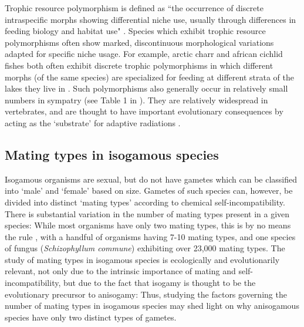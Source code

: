 Trophic resource polymorphism is defined as ``the occurrence of discrete intraspecific morphs showing differential niche use, usually through differences in feeding biology and habitat use" \citep{skulason_resource_1995}. Species which exhibit trophic resource polymorphisms often show marked, discontinuous morphological variations adapted for specific niche usage. For example, arctic charr and african cichlid fishes both often exhibit discrete trophic polymorphisms in which different morphs (of the same species) are specialized for feeding at different strata of the lakes they live in \citep{recknagel_ecosystem_2017}. Such polymorphisms also generally occur in relatively small numbers in sympatry (see Table 1 in \citep{smith_evolutionary_1996}). They are relatively widespread in vertebrates, and are thought to have important evolutionary consequences by acting as the `substrate' for adaptive radiations \citep{smith_evolutionary_1996}. 

\subsection{Mating types in isogamous species}
Isogamous organisms are sexual, but do not have gametes which can be classified into `male' and `female' based on size. Gametes of such species can, however, be divided into distinct `mating types' according to chemical self-incompatibility. There is substantial variation in the number of mating types present in a given species: While most organisms have only two mating types, this is by no means the rule \citep{phadke_rapid_2009,constable_rate_2018}, with a handful of organisms having 7-10 mating types, and one species of fungus (\textit{Schizophyllum commune}) exhibiting over 23,000 mating types. The study of mating types in isogamous species is ecologically and evolutionarily relevant, not only due to the intrinsic importance of mating and self-incompatibility, but due to the fact that isogamy is thought to be the evolutionary precursor to anisogamy: Thus, studying the factors governing the number of mating types in isogamous species may shed light on why anisogamous species have only two distinct types of gametes.

